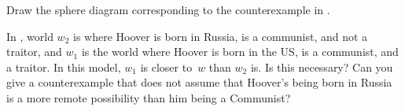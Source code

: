 \documentclass[../../../include/open-logic-section]{subfiles}
\begin{document}
\begin{prob}
Draw the sphere diagram corresponding to the counterexample in
.
\end{prob}

\begin{prob}
  In , world $w_2$ is where
  Hoover is born in Russia, is a communist, and not a traitor, and
  $w_1$ is the world where Hoover is born in the US, is a communist,
  and a traitor. In this model, $w_1$ is closer to~$w$ than $w_2$
  is. Is this necessary? Can you give a counterexample that does
  not assume that Hoover's being born in Russia is a more remote
  possibility than him being a Communist?
\end{prob}
\end{document}
